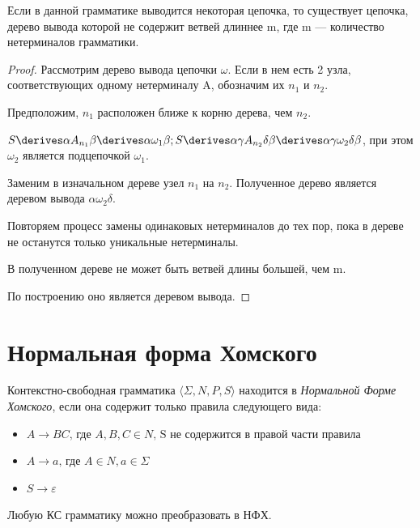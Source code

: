 \begin{lemma}
  Если в данной грамматике выводится некоторая цепочка, то существует цепочка, дерево вывода которой не содержит ветвей длиннее m, где m --- количество нетерминалов грамматики.
\end{lemma}

\begin{proof}
  Рассмотрим дерево вывода цепочки $\omega$. Если в нем есть 2 узла, соответствующих одному нетерминалу A, обозначим их $n_1$ и $n_2$.

  Предположим, $n_1$ расположен ближе к корню дерева, чем $n_2$.

  $S \derives \alpha A_{n_1} \beta \derives \alpha \omega_1 \beta; S \derives \alpha \gamma A_{n_2} \delta \beta \derives \alpha \gamma \omega_2 \delta \beta$, при этом $\omega_2$ является подцепочкой $\omega_1$.

  Заменим в изначальном дереве узел $n_1$ на $n_2$. Полученное дерево является деревом вывода $\alpha \omega_2 \delta$.

  Повторяем процесс замены одинаковых нетерминалов до тех пор, пока в дереве не останутся только уникальные нетерминалы.

  В полученном дереве не может быть ветвей длины большей, чем m.

  По построению оно является деревом вывода.
\end{proof}


\section{Нормальная форма Хомского}
\label{section:CNF}

\begin{definition}
Контекстно-свободная грамматика $\langle \Sigma, N, P, S\rangle$ находится в \textit{Нормальной Форме Хомского}, если она содержит только правила следующего вида:

\begin{itemize}
  \item $A \to B C \text{, где } A, B, C \in N \text{, S не содержится в правой части правила }$
  \item $A \to a \text{, где } A \in N, a \in \Sigma$
  \item $S \to \varepsilon$
\end{itemize}
\end{definition}

\begin{theorem}
Любую КС грамматику можно преобразовать в НФХ.
\end{theorem}

